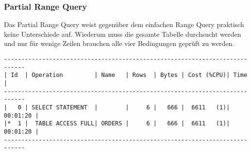 \documentclass[11pt,a4paper,parskip=half]{scrartcl}
\begin{document}
\subsubsection{Partial Range Query}
\label{no-idx-sel-range-partial}
Das Partial Range Query weist gegenüber dem einfachen Range Query praktisch keine Unterschiede auf. Wiederum muss die gesamte Tabelle durchsucht werden und nur für wenige Zeilen brauchen alle vier Bedingungen geprüft zu werden.

\begin{lstlisting}
----------------------------------------------------------------------------                                                                                                                                                                                                                                 
| Id  | Operation         | Name   | Rows  | Bytes | Cost (%CPU)| Time     |                                                                                                                                                                                                                                 
----------------------------------------------------------------------------                                                                                                                                                                                                                                 
|   0 | SELECT STATEMENT  |        |     6 |   666 |  6611   (1)| 00:01:20 |                                                                                                                                                                                                                                 
|*  1 |  TABLE ACCESS FULL| ORDERS |     6 |   666 |  6611   (1)| 00:01:20 |                                                                                                                                                                                                                                 
----------------------------------------------------------------------------                                                                                                                                                                                                                                 
                                                                                                                                                                                                                                                                                                             

\end{lstlisting}
\end{document}
